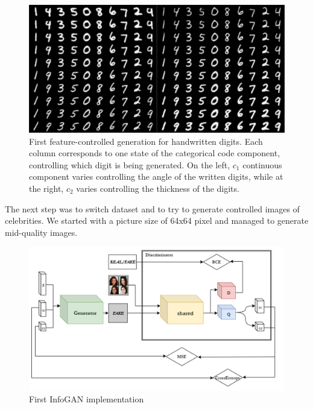 \documentclass{egpubl}
\begin{document}
\begin{figure}[!htb]
	\centering
	\includegraphics[width=1\linewidth]{pic/mnist}
	\caption{First feature-controlled generation for handwritten digits. Each column corresponds to one state of the categorical code component, controlling which digit is being generated. On the left, $c_1$ continuous component varies controlling the angle of the written digits, while at the right, $c_2$ varies controlling the thickness of the digits.}
	\label{fig:mnist_results}
\end{figure}

The next step was to switch dataset and to try to generate controlled images of celebrities. We started with a picture size of 64x64 pixel and managed to generate mid-quality images.

\begin{figure}[!htb]
	\centering
	\includegraphics[width=\linewidth]{pic/1}
	\caption{First InfoGAN implementation}
	\label{fig:infogan}
\end{figure}
\end{document}
